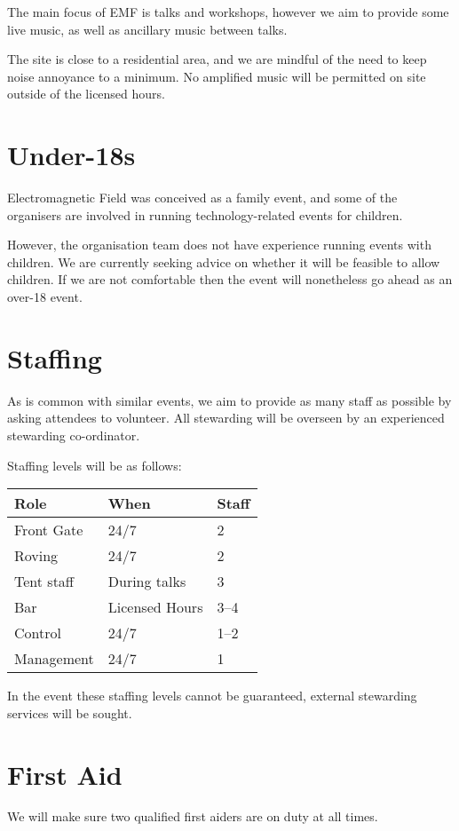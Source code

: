 The main focus of EMF is talks and workshops, however we aim to provide some live music,
as well as ancillary music between talks.

The site is close to a residential area, and we are mindful of the need to keep noise annoyance to a minimum.
No amplified music will be permitted on site outside of the licensed hours.

\section{Under-18s}

Electromagnetic Field was conceived as a family event, and some of the organisers are involved in
running technology-related events for children.

However, the organisation team does not have experience running events with children. We are
currently seeking advice on whether it will be feasible to allow children. If we are not comfortable
then the event will nonetheless go ahead as an over-18 event.

\section{Staffing}

As is common with similar events, we aim to provide as many staff as possible
by asking attendees to volunteer. All stewarding will be overseen by an experienced stewarding co-ordinator.

Staffing levels will be as follows:

\begin{tabular}{ l l l }
Role & When & Staff \\
\hline
Front Gate & 24/7 & 2 \\
Roving & 24/7 & 2 \\
Tent staff & During talks & 3 \\
Bar & Licensed Hours & 3--4 \\
Control & 24/7 & 1--2 \\
Management & 24/7 & 1
\end{tabular}

In the event these staffing levels cannot be guaranteed, external stewarding services will be sought.

\section{First Aid}

We will make sure two qualified first aiders are on duty at all times.

